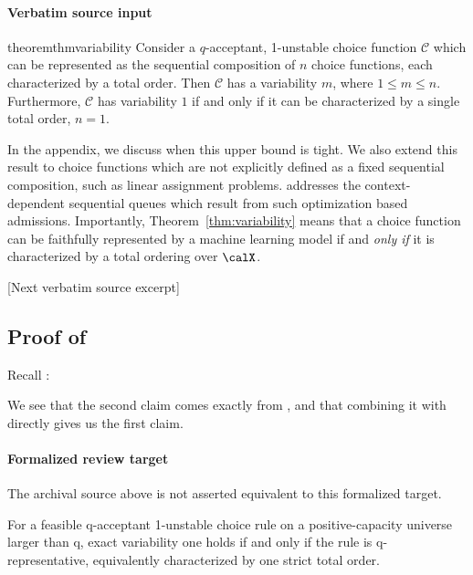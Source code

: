 \documentclass[10pt]{article}
\begin{document}
\paragraph{Verbatim source input}
\begin{ReviewVerbatim}
\begin{restatable}{theorem}{thmvariability}
\label{thm:variability}
Consider a $q$-acceptant, 1-unstable choice function $\mathcal C$ which
can be represented as the sequential composition of $n$ choice functions, each characterized by a total order.
Then $\mathcal C$ has a variability  $m$, where $1 \leq m \leq n$. Furthermore, $\mathcal C$ has variability $1$ if and only if it can be characterized by a single total order, $n=1$.
\end{restatable}
In the appendix, we discuss when this upper bound is tight. We also extend this result to choice functions which are not explicitly defined as a fixed sequential composition, such as linear assignment problems.
 addresses the context-dependent sequential queues which result from such optimization based admissions.
Importantly, Theorem~\ref{thm:variability} means that a choice function can be faithfully represented by a machine learning model if and \emph{only if} it is characterized by a total ordering over $\calX$.

[Next verbatim source excerpt]

\subsection{Proof of } \label{sec:variability-proof}

Recall :
\thmvariability*

We see that the second claim comes exactly from , and that combining it with  directly gives us the first claim.
\end{ReviewVerbatim}


\paragraph{Formalized review target}
The archival source above is not asserted equivalent to this formalized target.
\begin{ReviewVerbatim}
For a feasible q-acceptant 1-unstable choice rule on a positive-capacity universe larger than q, exact variability one holds if and only if the rule is q-representative, equivalently characterized by one strict total order.
\end{ReviewVerbatim}
\end{document}
